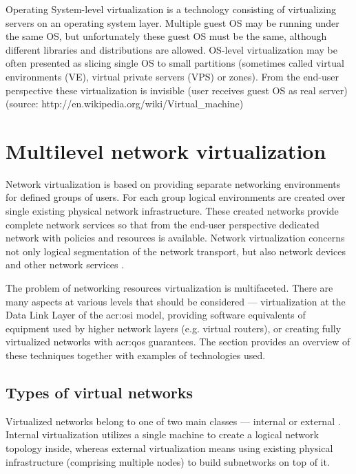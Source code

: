 \documentclass[11pt]{book}
\begin{document}
        Operating System-level virtualization is a technology consisting of virtualizing servers on an operating system
        layer.  Multiple guest OS may be running under the same OS, but unfortunately these guest OS must be the same,
        although different libraries and distributions are allowed. OS-level virtualization may be often presented as
        slicing single OS to small partitions (sometimes called virtual environments (VE), virtual private servers (VPS)
        or zones). From the end-user perspective these virtualization is invisible (user receives guest OS as real
        server) (source: http://en.wikipedia.org/wiki/Virtual\_machine)


    \section{Multilevel network virtualization}
    \label{sec:ctx:multi}

      Network virtualization is based on providing separate networking environments for defined groups of users. For
      each group logical environments are created over single existing physical network infrastructure. These created
      networks provide complete network services so that from the end-user perspective dedicated network with policies
      and resources is available. Network virtualization concerns not only logical segmentation of the network
      transport, but also network devices and other network services \cite{network_virt}.

      The problem of networking resources virtualization is multifaceted. There are many aspects at various levels that
      should be considered --- virtualization at the Data Link Layer of the \gls{acr:osi} model, providing software
      equivalents of equipment used by higher network layers (e.g. virtual routers), or creating fully virtualized
      networks with \gls{acr:qos} guarantees. The section provides an overview of these techniques together with
      examples of technologies used.


      \subsection{Types of virtual networks}

        Virtualized networks belong to one of two main classes --- internal or external \cite{nsag}. Internal
        virtualization utilizes a single machine to create a logical network topology inside, whereas external
        virtualization means using existing physical infrastructure (comprising multiple nodes) to build subnetworks on
        top of it.
\end{document}
